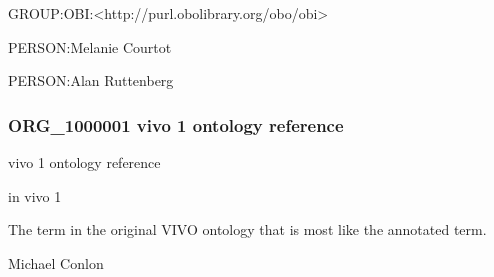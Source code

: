 \documentclass[letterpaper,10pt,english]{sphinxmanual}
\begin{document}
\begin{sphinxShadowBox}

\sphinxAtStartPar
GROUP:OBI:\textless{}http://purl.obolibrary.org/obo/obi\textgreater{}
\end{sphinxShadowBox}

\begin{sphinxShadowBox}

\sphinxAtStartPar
PERSON:Melanie Courtot

\sphinxAtStartPar
PERSON:Alan Ruttenberg
\end{sphinxShadowBox}
\begin{quote}

\ignorespaces \end{quote}


\subsubsection{ORG\_1000001 \sphinxhyphen{} vivo 1 ontology reference}
\label{\detokenize{doc-ORG_1000001:org-1000001-vivo-1-ontology-reference}}\label{\detokenize{doc-ORG_1000001:index-0}}\label{\detokenize{doc-ORG_1000001::doc}}
\begin{sphinxShadowBox}

\sphinxAtStartPar
vivo 1 ontology reference
\end{sphinxShadowBox}

\begin{sphinxShadowBox}

\sphinxAtStartPar
in vivo 1
\end{sphinxShadowBox}

\begin{sphinxShadowBox}

\sphinxAtStartPar
The term in the original VIVO ontology that is most like the annotated term.
\end{sphinxShadowBox}

\begin{sphinxShadowBox}

\sphinxAtStartPar
Michael Conlon 
\end{sphinxShadowBox}
\end{document}
